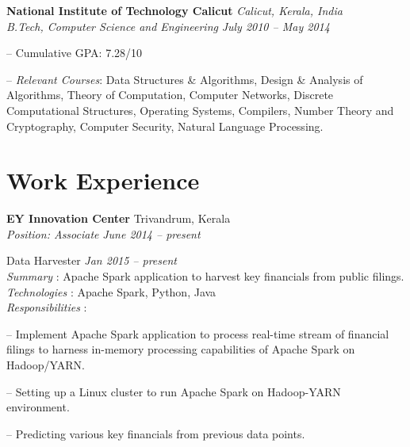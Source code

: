 \documentclass[margin,line]{resume}
\begin{document}
\begin{resume}
    \textbf{National Institute of Technology Calicut} \hfill \textit{Calicut, Kerala, India} \vspace{1mm}\\\vspace{1mm}%
    \textsl{B.Tech, Computer Science and Engineering} \hfill \textit{ July 2010 -- May 2014}\vspace{-3mm}\\\vspace{-1mm}%
    \begin{list2}
        \item[--] Cumulative GPA: 7.28/10 
        \item[--] \textit{Relevant Courses}: Data Structures \& Algorithms, Design \& Analysis of Algorithms, Theory
of Computation, Computer Networks, Discrete Computational Structures, Operating Systems, 
Compilers, Number Theory and Cryptography, Computer Security, Natural Language Processing.
    \end{list2}\vspace{-1.5mm}
    
 \vspace{3mm}


    \section{\mysidestyle Work Experience}


    \textbf{EY Innovation Center } 				\hfill  Trivandrum, Kerala \\
      \textit{Position: Associate } 			\hfill \textit{June 2014 -- present}
      

Data Harvester				 				\hfill \textit{Jan 2015 -- present} \\
\textit{Summary} : Apache Spark application to harvest key financials from public filings. \\
      \textit{Technologies} : Apache Spark, Python, Java\\
\textit{Responsibilities} : 
     	 	\begin{list2}
\item[--]Implement Apache Spark application to process real-time stream of financial filings to harness
 in-memory processing capabilities of Apache Spark on Hadoop/YARN.
	\item[--] Setting up a Linux cluster to run Apache Spark on Hadoop-YARN environment.%
	\item[--] Predicting various key financials from previous data points.
	\end{list2}


\end{resume}
\end{document}

